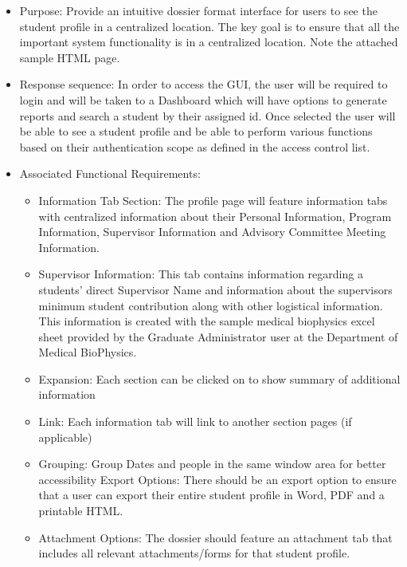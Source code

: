 \documentclass{journal}
\begin{document}
\begin{itemize}
\item Purpose: Provide an intuitive dossier format interface for users to see the student profile in a centralized location. The key goal is to ensure that all the important system functionality is in a centralized location. Note the attached sample HTML page.
\item Response sequence: In order to access the GUI, the user will be required to login and will be taken to a Dashboard which will have options to generate reports and search a student by their assigned id. Once selected the user will be able to see a student profile and be able to perform various functions based on their authentication scope as defined in the access control list.
\item Associated Functional Requirements:
\begin{itemize}
\item Information Tab Section: The profile page will feature information tabs with centralized information about their Personal Information, Program Information, Supervisor Information and Advisory Committee Meeting Information. 
\item Supervisor Information: This tab contains information regarding a students' direct Supervisor Name and information about the supervisors minimum student contribution along with other logistical information. This information is created with the sample medical biophysics excel sheet provided by the Graduate Administrator user at the Department of Medical BioPhysics.	

\item Expansion: Each section can be clicked on to show summary of additional information
\item Link:  Each information tab will link to another section pages (if applicable)
\item Grouping: Group Dates and people in the same window area for better accessibility
Export Options: There should be an export option to ensure that a user can export their entire student profile in Word, PDF and a printable HTML.
\item Attachment Options: The dossier should feature an attachment tab that includes all relevant attachments/forms for that student profile.
\end{itemize}
\end{itemize}
\end{document}
